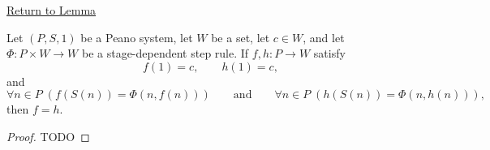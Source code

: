 \newpage
{}
\label{prf:uniqueness-of-general-recursive-functions}

\begin{remark*}[Return]
\hyperref[lem:uniqueness-of-general-recursive-functions]{Return to Lemma}
\end{remark*}

\begin{theorem*}
Let $(P,S,1)$ be a Peano system, let $W$ be a set, let $c\in W$, and let
$\Phi:P\times W\to W$ be a stage-dependent step rule. If $f,h:P\to W$ satisfy
\[
f(1)=c,\qquad h(1)=c,
\]
and
\[
\forall n\in P\;(f(S(n))=\Phi(n,f(n)))
\qquad\text{and}\qquad
\forall n\in P\;(h(S(n))=\Phi(n,h(n))),
\]
then $f=h$.
\end{theorem*}

\begin{proof}
TODO
\end{proof}
